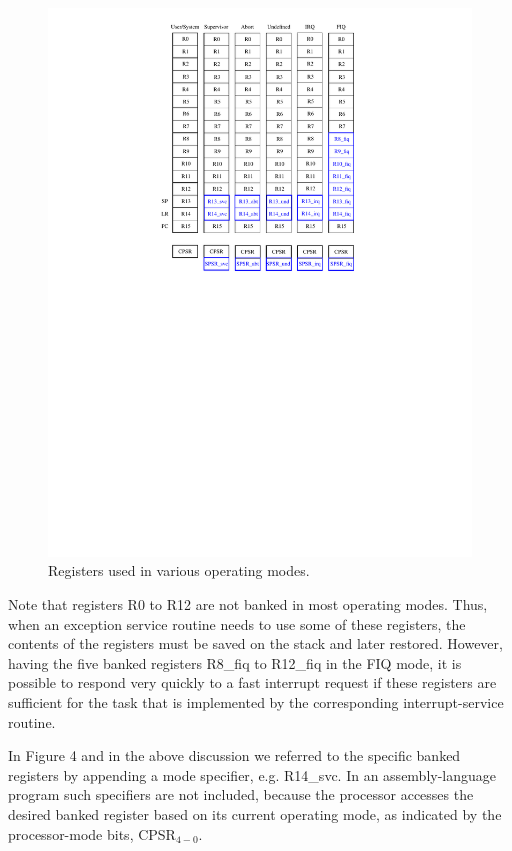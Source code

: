 \documentclass[11pt, twoside, pdftex]{article}
\begin{document}
\begin{figure}[H]
   \begin{center}
      \includegraphics[scale=1]{figures/figure4.pdf}
   \caption{Registers used in various operating modes.} 
	 \label{fig:4}
	 \end{center}
\end{figure}

Note that registers R0 to R12 are not banked in most operating
modes. Thus, when an exception service routine needs to use some
of these registers, the contents of the registers must be saved
on the stack and later restored.
However, having the five banked registers R8\_fiq to R12\_fiq in
the FIQ mode, it is possible to respond very quickly to a fast
interrupt request if these registers are sufficient for the task
that is implemented by the corresponding interrupt-service
routine.

In Figure 4 and in the above discussion we referred to the
specific banked registers by appending a mode specifier, e.g.
R14\_svc. In an assembly-language program such specifiers are
not included, because the processor accesses the desired banked
register based on its current operating mode, as indicated by
the processor-mode bits, CPSR$_{4-0}$.  
\end{document}
